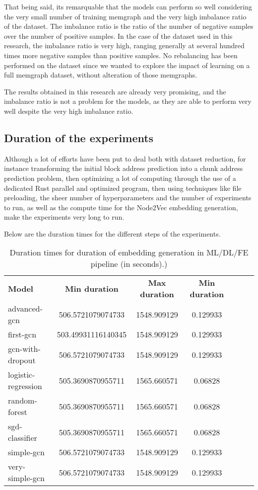 That being said, its remarquable that the models can perform so well considering the very small number of training memgraph and the very high imbalance ratio of the dataset. The imbalance ratio is the ratio of the number of negative samples over the number of positive samples. In the case of the dataset used in this research, the imbalance ratio is very high, ranging generally at several hundred times more negative samples than positive samples. No rebalancing has been performed on the dataset since we wanted to explore the impact of learning on a full memgraph dataset, without alteration of those memgraphs.

The results obtained in this research are already very promising, and the imbalance ratio is not a problem for the models, as they are able to perform very well despite the very high imbalance ratio.

\subsection{Duration of the experiments}

Although a lot of efforts have been put to deal both with dataset reduction, for instance transforming the initial block address prediction into a chunk address prediction problem, then optimizing a lot of computing through the use of a dedicated Rust parallel and optimized program, then using techniques like file preloading, the sheer number of hyperparameters and the number of experiments to run, as well as the compute time for the Node2Vec embedding generation, make the experiments very long to run. 

Below are the duration times for the different steps of the experiments.

\begin{table}[H]
    \centering
    \caption{Duration times for duration of embedding generation in ML/DL/FE pipeline (in seconds).)}
    \begin{tabular}{lcccccc}
      \textbf{Model}  & \textbf{Min duration} & \textbf{Max duration} & \textbf{Min duration} \\
        advanced-gcn & 506.5721079074733 & 1548.909129 & 0.129933 \\
        first-gcn & 503.49931116140345 & 1548.909129 & 0.129933 \\
        gcn-with-dropout & 506.5721079074733 & 1548.909129 & 0.129933 \\
        logistic-regression & 505.3690870955711 & 1565.660571 & 0.06828 \\
        random-forest & 505.3690870955711 & 1565.660571 & 0.06828 \\
        sgd-classifier & 505.3690870955711 & 1565.660571 & 0.06828 \\
        simple-gcn & 506.5721079074733 & 1548.909129 & 0.129933 \\
        very-simple-gcn & 506.5721079074733 & 1548.909129 & 0.129933 \\
    \end{tabular}
\end{table}

